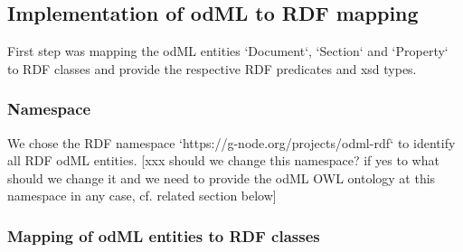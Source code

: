 \documentclass{article}
\begin{document}
\subsection{Implementation of odML to RDF mapping}

First step was mapping the odML entities `Document`, `Section` and `Property` to RDF classes and provide the respective RDF predicates and xsd types.

\subsubsection{Namespace}

We chose the RDF namespace `https://g-node.org/projects/odml-rdf` to identify all RDF odML entities. [xxx should we change this namespace? if yes to what should we change it and we need to provide the odML OWL ontology at this namespace in any case, cf. related section below]

\subsubsection{Mapping of odML entities to RDF classes}
\end{document}
